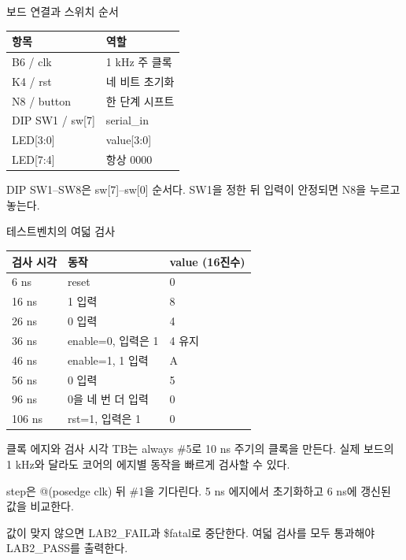 \begin{frame}{보드 연결과 스위치 순서}
\small
\begin{center}\renewcommand{\arraystretch}{1.55}\begin{tabular}{ll}
항목 & 역할\\\hline
B6 / clk & 1 kHz 주 클록\\
K4 / rst & 네 비트 초기화\\
N8 / button & 한 단계 시프트\\
DIP SW1 / sw[7] & serial\_in\\
LED[3:0] & value[3:0]\\
LED[7:4] & 항상 0000\\
\end{tabular}\end{center}DIP SW1–SW8은 sw[7]–sw[0] 순서다. SW1을 정한 뒤 입력이 안정되면 N8을 누르고 놓는다.\par
\end{frame}

\begin{frame}{테스트벤치의 여덟 검사}
\small
\begin{center}\renewcommand{\arraystretch}{1.55}\begin{tabular}{lll}
검사 시각 & 동작 & value (16진수)\\\hline
6 ns & reset & 0\\
16 ns & 1 입력 & 8\\
26 ns & 0 입력 & 4\\
36 ns & enable=0, 입력은 1 & 4 유지\\
46 ns & enable=1, 1 입력 & A\\
56 ns & 0 입력 & 5\\
96 ns & 0을 네 번 더 입력 & 0\\
106 ns & rst=1, 입력은 1 & 0\\
\end{tabular}\end{center}
\end{frame}

\begin{frame}{클록 에지와 검사 시각}
\small
TB는 always \#5로 10 ns 주기의 클록을 만든다. 실제 보드의 1 kHz와 달라도 코어의 에지별 동작을 빠르게 검사할 수 있다.\par\vspace{0.26cm}step은 @(posedge clk) 뒤 \#1을 기다린다. 5 ns 에지에서 초기화하고 6 ns에 갱신된 값을 비교한다.\par\vspace{0.26cm}값이 맞지 않으면 LAB2\_FAIL과 \$fatal로 중단한다. 여덟 검사를 모두 통과해야 LAB2\_PASS를 출력한다.\par
\end{frame}


